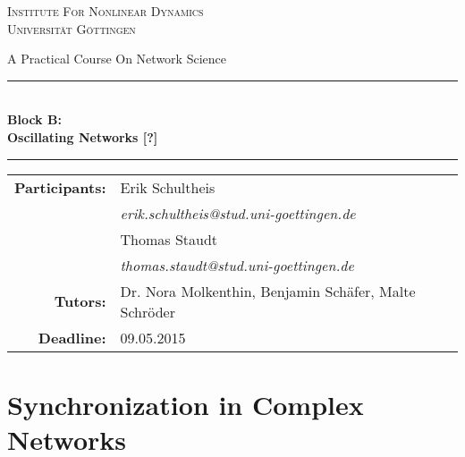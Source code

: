 \documentclass{scrartcl}
\begin{document}
\begin{titlepage}\centering
\textsc{\Large Institute For Nonlinear Dynamics \\[1.5ex] Universität Göttingen}

\vspace*{2cm}
{\huge A Practical Course On Network Science}
\vspace*{2cm}

\rule{\textwidth}{1pt}\\[0.5cm]
{\bfseries \huge Block B: \\[0.5cm] \huge \bfseries Oscillating Networks [?]\\[0.5cm]}
\rule{\textwidth}{1pt}

\vspace*{4cm}

\begin{Large}\begin{tabular}{rl}
        \textbf{Participants:}  & Erik Schultheis                                \\    
                   & \textit{erik.schultheis@stud.uni-goettingen.de}\\[0.5cm]
                   & Thomas Staudt                                  \\
                   & \textit{thomas.staudt@stud.uni-goettingen.de}  \\[1.0cm]

       \textbf{Tutors:}        & Dr. Nora Molkenthin, Benjamin Schäfer, Malte Schröder  \\[1.0cm]
       \textbf{Deadline:}      & 09.05.2015
\end{tabular}\end{Large}

\vspace*{1.5cm}


\end{titlepage}

\tableofcontents
\clearpage

\section{Synchronization in Complex Networks}
\end{document}
